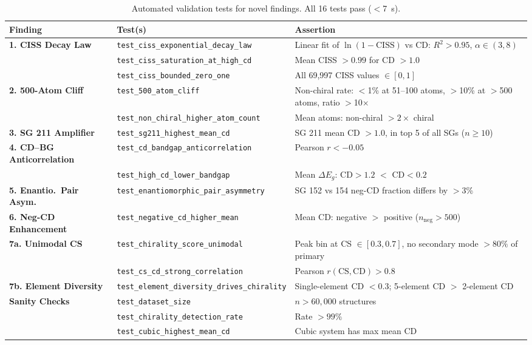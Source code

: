 \documentclass[11pt,a4paper]{article}
\begin{document}
\begin{table}[H]
\centering
\caption{Automated validation tests for novel findings. All 16 tests pass ($<$7~s).}
\label{tab:tests}
\small
\begin{tabular}{p{3.8cm}p{4.5cm}p{4.2cm}}
\toprule
Finding & Test(s) & Assertion \\
\midrule
\textbf{1. CISS Decay Law} &
  \texttt{test\_ciss\_exponential\_decay\_law} &
  Linear fit of $\ln(1{-}\text{CISS})$ vs CD: $R^2 > 0.95$, $\alpha \in (3, 8)$ \\
  &
  \texttt{test\_ciss\_saturation\_at\_high\_cd} &
  Mean CISS $> 0.99$ for CD $> 1.0$ \\
  &
  \texttt{test\_ciss\_bounded\_zero\_one} &
  All 69,997 CISS values $\in [0, 1]$ \\
\midrule
\textbf{2. 500-Atom Cliff} &
  \texttt{test\_500\_atom\_cliff} &
  Non-chiral rate: $<$1\% at 51--100 atoms, $>$10\% at $>$500 atoms, ratio $>$10$\times$ \\
  &
  \texttt{test\_non\_chiral\_higher\_atom\_count} &
  Mean atoms: non-chiral $> 2\times$ chiral \\
\midrule
\textbf{3. SG 211 Amplifier} &
  \texttt{test\_sg211\_highest\_mean\_cd} &
  SG 211 mean CD $> 1.0$, in top 5 of all SGs ($n \geq 10$) \\
\midrule
\textbf{4. CD--BG Anticorrelation} &
  \texttt{test\_cd\_bandgap\_anticorrelation} &
  Pearson $r < -0.05$ \\
  &
  \texttt{test\_high\_cd\_lower\_bandgap} &
  Mean $\Delta E_g$: CD${>}1.2$ $<$ CD${<}0.2$ \\
\midrule
\textbf{5. Enantio.\ Pair Asym.} &
  \texttt{test\_enantiomorphic\_pair\_asymmetry} &
  SG 152 vs 154 neg-CD fraction differs by $>$3\% \\
\midrule
\textbf{6. Neg-CD Enhancement} &
  \texttt{test\_negative\_cd\_higher\_mean} &
  Mean CD: negative $>$ positive ($n_{\text{neg}} > 500$) \\
\midrule
\textbf{7a. Unimodal CS} &
  \texttt{test\_chirality\_score\_unimodal} &
  Peak bin at CS $\in [0.3, 0.7]$, no secondary mode ${>}80\%$ of primary \\
  &
  \texttt{test\_cs\_cd\_strong\_correlation} &
  Pearson $r(\text{CS}, \text{CD}) > 0.8$ \\
\midrule
\textbf{7b. Element Diversity} &
  \texttt{test\_element\_diversity\_drives\_chirality} &
  Single-element CD $< 0.3$; 5-element CD $>$ 2-element CD \\
\midrule
\textbf{Sanity Checks} &
  \texttt{test\_dataset\_size} &
  $n > 60{,}000$ structures \\
  &
  \texttt{test\_chirality\_detection\_rate} &
  Rate $> 99\%$ \\
  &
  \texttt{test\_cubic\_highest\_mean\_cd} &
  Cubic system has max mean CD \\
\bottomrule
\end{tabular}
\end{table}
\end{document}
